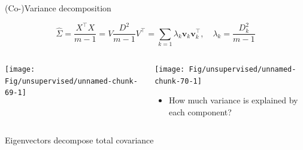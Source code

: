 \documentclass[
  ignorenonframetext,
  aspectratio=169]{beamer}
\providecommand{\tightlist}{%
  \setlength{\itemsep}{0pt}\setlength{\parskip}{0pt}}
\begin{document}
\begin{frame}{(Co-)Variance decomposition}
\protect\hypertarget{co-variance-decomposition-1}{}
\scriptsize

\normalsize

\[\hat{\Sigma} = \frac{X^{\top}X}{m-1} = V \frac{D^{2}}{m-1} V^{\top} = \sum_{k=1} \lambda_{k} \mathbf{v}_{k} \mathbf{v}_{k}^{\top},\quad \lambda_{k}=\frac{D_{k}^{2}}{m-1}\]

\begin{columns}[T]
\begin{column}{.28\textwidth}
\scriptsize

\begin{center}\texttt{[image: Fig/unsupervised/unnamed-chunk-69-1]} \end{center}

\normalsize
\end{column}

\begin{column}{.75\textwidth}
\scriptsize

\begin{center}\texttt{[image: Fig/unsupervised/unnamed-chunk-70-1]} \end{center}

\normalsize

\begin{itemize}
\tightlist
\item
  How much variance is explained by each component?
\end{itemize}
\end{column}
\end{columns}
\end{frame}

\begin{frame}{Eigenvectors decompose total covariance}
\protect\hypertarget{eigenvectors-decompose-total-covariance}{}
\scriptsize


\normalsize

\scriptsize


\normalsize
\end{frame}
\end{document}
